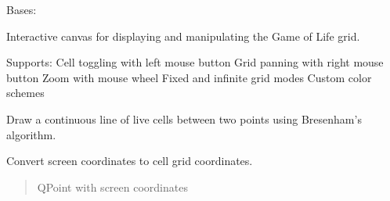 \documentclass[letterpaper,10pt,oneside,english]{sphinxhowto}
\begin{document}
\begin{fulllineitems}
\label{\detokenize{gui:gui.game_modules.grid_canvas.GridCanvas}}
\pysigstartsignatures
\pysiglinewithargsret
{}
{\sphinxparamcomma {}\sphinxparamcomma {}\sphinxparamcomma {}\sphinxparamcomma {}\sphinxparamcomma {}}
{}
\pysigstopsignatures
\sphinxAtStartPar
Bases: 

\sphinxAtStartPar
Interactive canvas for displaying and manipulating the Game of Life grid.

\sphinxAtStartPar
Supports:
\sphinxhyphen{} Cell toggling with left mouse button
\sphinxhyphen{} Grid panning with right mouse button
\sphinxhyphen{} Zoom with mouse wheel
\sphinxhyphen{} Fixed and infinite grid modes
\sphinxhyphen{} Custom color schemes

\begin{fulllineitems}
\label{\detokenize{gui:gui.game_modules.grid_canvas.GridCanvas._draw_line_between_points}}
\pysigstartsignatures
\pysiglinewithargsret
{}
{\sphinxparamcomma {}\sphinxparamcomma {}\sphinxparamcomma {}}
{}
\pysigstopsignatures
\sphinxAtStartPar
Draw a continuous line of live cells between two points using Bresenham’s algorithm.

\end{fulllineitems}


\begin{fulllineitems}
\label{\detokenize{gui:gui.game_modules.grid_canvas.GridCanvas._get_cell_coords}}
\pysigstartsignatures
\pysiglinewithargsret
{}
{}
{}
\pysigstopsignatures
\sphinxAtStartPar
Convert screen coordinates to cell grid coordinates.
\begin{quote}\begin{description}
\sphinxAtStartPar
{} \textendash{} QPoint with screen coordinates


\end{description}
\end{quote}
\end{fulllineitems}
\end{fulllineitems}
\end{document}

